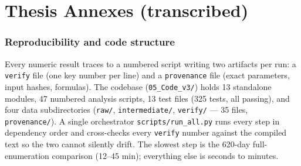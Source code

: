 \part{Thesis Annexes (transcribed)}

\section{Reproducibility and code structure}
Every numeric result traces to a numbered script writing two artifacts per run: a \texttt{verify} file (one key number per line) and a \texttt{provenance} file (exact parameters, input hashes, formulas). The codebase (\texttt{05\_Code\_v3/}) holds 13 standalone modules, 47 numbered analysis scripts, 13 test files (325 tests, all passing), and four data subdirectories (\texttt{raw/}, \texttt{intermediate/}, \texttt{verify/} --- 35 files, \texttt{provenance/}). A single orchestrator \texttt{scripts/run\_all.py} runs every step in dependency order and cross-checks every \texttt{verify} number against the compiled text so the two cannot silently drift. The slowest step is the 620-day full-enumeration comparison (12--45 min); everything else is seconds to minutes.

